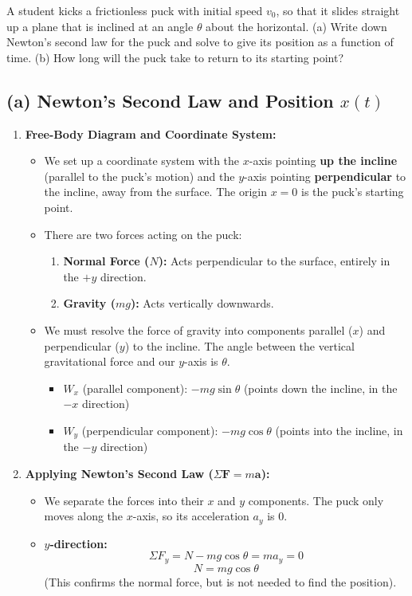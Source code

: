 \documentclass[11pt, a4paper]{article} %
\begin{document}
A student kicks a frictionless puck with initial speed $v_0$, so that it slides straight up a plane that is inclined at an angle $\theta$ about the horizontal. (a) Write down Newton's second law for the puck and solve to give its position as a function of time. (b) How long will the puck take to return to its starting point?

\subsection*{(a) Newton's Second Law and Position $x(t)$}

\begin{enumerate}
    \item \textbf{Free-Body Diagram and Coordinate System:}
    \begin{itemize}
        \item We set up a coordinate system with the $x$-axis pointing \textbf{up the incline} (parallel to the puck's motion) and the $y$-axis pointing \textbf{perpendicular} to the incline, away from the surface. The origin $x=0$ is the puck's starting point.
        \item There are two forces acting on the puck:
        \begin{enumerate}
            \item \textbf{Normal Force ($N$):} Acts perpendicular to the surface, entirely in the $+y$ direction.
            \item \textbf{Gravity ($mg$):} Acts vertically downwards.
        \end{enumerate}
        \item We must resolve the force of gravity into components parallel ($x$) and perpendicular ($y$) to the incline. The angle between the vertical gravitational force and our $y$-axis is $\theta$.
        \begin{itemize}
            \item $W_x$ (parallel component): $-mg \sin\theta$ (points down the incline, in the $-x$ direction)
            \item $W_y$ (perpendicular component): $-mg \cos\theta$ (points into the incline, in the $-y$ direction)
        \end{itemize}
    \end{itemize}

    \item \textbf{Applying Newton's Second Law ($\Sigma \textbf{F} = m\textbf{a}$):}
    \begin{itemize}
        \item We separate the forces into their $x$ and $y$ components. The puck only moves along the $x$-axis, so its acceleration $a_y$ is 0.
        \item \textbf{$y$-direction:}
        $$\Sigma F_y = N - mg \cos\theta = m a_y = 0$$
        $$N = mg \cos\theta$$
        (This confirms the normal force, but is not needed to find the position).


\end{itemize}
\end{enumerate}
\end{document}

